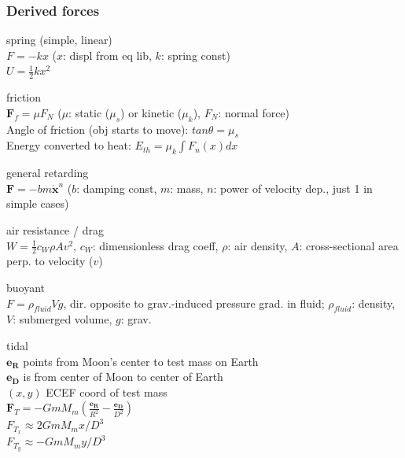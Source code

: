 \documentclass[letterpaper,landscape,10pt]{article}
\newenvironment{mydescription}
{\begin{description}
	\setlength{\itemsep}{0pt}
	\setlength{\parskip}{0pt}
	\setlength{\parsep}{-1pt}}
{\end{description}}
\begin{document}
{\begin{multicols}{4}
\begin{mydescription}
			\end{mydescription}
		
		\subsubsection*{Derived forces}
			\begin{mydescription}
				\item[spring] (simple, linear) \\
					$F = -kx$ ($x$: displ from eq lib, $k$: spring const)  \\
					$U = \frac{1}{2}kx^2$

				\item[friction] \ \\
					$\bm{F}_f = \mu F_N$ ($\mu$: static ($\mu_s$) or
					kinetic ($\mu_k$), $F_N$: normal force)\\
					Angle of friction (obj starts to move): $tan \theta = \mu_s$\\
					Energy converted to heat: $E_{th} = \mu_k \int F_n(x)dx$

				\item[general retarding] \  \\
					$\bm{F} = -bm\dot{\bm{x}}^n$ ($b$: damping const,
					$m$: mass, $n$: power of velocity dep., just 1 in simple cases)  \\

				\item[air resistance / drag] \  \\
					$W=\frac{1}{2}c_W\rho Av^2$,
					$c_W$: dimensionless drag coeff, $\rho$: air density,
					$A$: cross-sectional area perp. to velocity ($v$) \\

				\item[buoyant] \  \\
					$F = \rho_{fluid}Vg$, dir. opposite to grav.-induced pressure grad.
					in fluid; $\rho_{fluid}$: density, $V$: submerged volume,
					$g$: grav. \\

				\item[tidal] \ \\
				  $\bm{e_R}$ points from Moon's center to test mass on Earth \\
				  $\bm{e_D}$ is from center of Moon to center of Earth \\
				  $(x,y)$ ECEF coord of test mass\\
				  $\bm{F}_T=-GmM_m \left( \frac{\bm{e_R}}{R^2} -
				  \frac{\bm{e_D}}{D^2}\right)$\\
				  $F_{T_x} \approx 2GmM_mx/D^3$\\
				  $F_{T_y} \approx -GmM_my/D^3$


\end{mydescription}
\end{multicols}}
\end{document}

